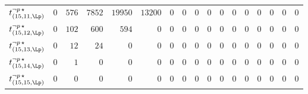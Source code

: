 \begin{tabular}{r|rrrrrrrrrrrrrrrr}
  $t^{\neg p \, \star}_{(15,11,\Lp)}$ & $0$ & $576$ & $7852$ & $19950$ & $13200$ & $0$ & $0$ & $0$ & $0$ & $0$ & $0$ & $0$ & $0$ & $0$ & $0$ & $0$ \\
  $t^{\neg p \, \star}_{(15,12,\Lp)}$ & $0$ & $102$ & $600$ & $594$ & $0$ & $0$ & $0$ & $0$ & $0$ & $0$ & $0$ & $0$ & $0$ & $0$ & $0$ & $0$ \\
  $t^{\neg p \, \star}_{(15,13,\Lp)}$ & $0$ & $12$ & $24$ & $0$ & $0$ & $0$ & $0$ & $0$ & $0$ & $0$ & $0$ & $0$ & $0$ & $0$ & $0$ & $0$ \\
  $t^{\neg p \, \star}_{(15,14,\Lp)}$ & $0$ & $1$ & $0$ & $0$ & $0$ & $0$ & $0$ & $0$ & $0$ & $0$ & $0$ & $0$ & $0$ & $0$ & $0$ & $0$ \\
  $t^{\neg p \, \star}_{(15,15,\Lp)}$ & $0$ & $0$ & $0$ & $0$ & $0$ & $0$ & $0$ & $0$ & $0$ & $0$ & $0$ & $0$ & $0$ & $0$ & $0$ & $0$ \\
\end{tabular}
